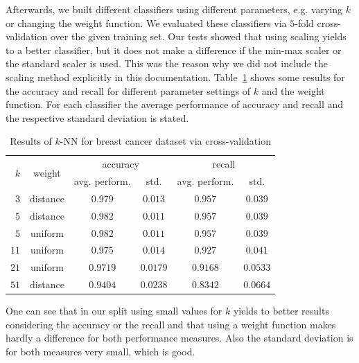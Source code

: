 \documentclass[a4paper,11pt]{article}
\begin{document}
        Afterwards, we built different classifiers using different parameters, e.g. varying $k$ or changing the weight function. We evaluated these classifiers via $5$-fold cross-validation over the given training set. Our tests showed that using scaling yields to a better classifier, but it does not make a difference if the min-max scaler or the standard scaler is used. This was the reason why we did not include the scaling method explicitly in this documentation. Table~\ref{tbl:kNN_breast-cancer_cross-validation} shows some results for the accuracy and recall for different parameter settings of $k$ and the weight function. For each classifier the average performance of accuracy and recall and the respective standard deviation is stated.
        
        \begin{table}[h]
        \centering
            \begin{tabular}[h]{r|c|c|c|c|c|}
                \multirow{2}{*}{$k$} & \multirow{2}{*}{weight} & \multicolumn{2}{|c|}{accuracy} & \multicolumn{2}{|c|}{recall} \\
                & & avg. perform. & std. & avg. perform. & std. \\
                \hline
                $3$ & distance & $0.979$ & $0.013$ & $0.957$ & $0.039$\\
                \hline
                $5$ & distance & $0.982$ & $0.011$ &$0.957$ & $0.039$\\
                \hline
                $5$ & uniform & $0.982$ & $0.011$ & $0.957$ & $0.039$\\
                \hline
                $11$ & uniform & $0.975$ & $0.014$ & $0.927$ & $0.041$ \\
                \hline
                $21$ & uniform & $0.9719$ & $0.0179$ & $0.9168$ & $0.0533$ \\
                \hline
                $51$ & distance & $0.9404$ & $0.0238$ & $0.8342$ & $0.0664$
            \end{tabular}
            \caption{Results of $k$-NN for breast cancer dataset via cross-validation}
            \label{tbl:kNN_breast-cancer_cross-validation}
        \end{table}
        
        One can see that in our split using small values for $k$ yields to better results considering the accuracy or the recall and that using a weight function makes hardly a difference for both performance measures. Also the standard deviation is for both measures very small, which is good. 
        
\end{document}
